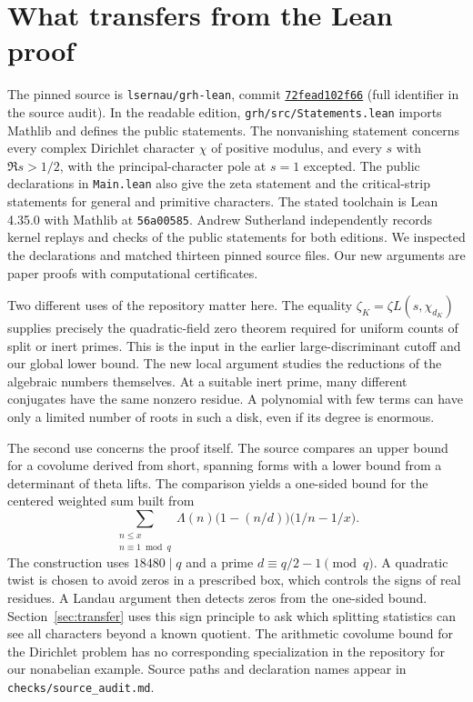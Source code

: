 \documentclass[11pt]{article}
\begin{document}
\section{What transfers from the Lean proof}
The pinned source is \texttt{lsernau/grh-lean}, commit
\href{https://github.com/lsernau/grh-lean/commit/72fead102f663d5c7a407964a13dc0cf9d977207}{\texttt{72fead102f66}} (full identifier in the source audit). In the readable edition, \texttt{grh/src/Statements.lean} imports Mathlib and defines the public statements. The nonvanishing statement concerns every complex Dirichlet character $\chi$ of positive modulus, and every $s$ with $\Re s>1/2$, with the principal-character pole at $s=1$ excepted. The public declarations in \texttt{Main.lean} also give the zeta statement and the critical-strip statements for general and primitive characters. The stated toolchain is Lean 4.35.0 with Mathlib at \texttt{56a00585}. Andrew Sutherland independently records kernel replays and checks of the public statements for both editions. We inspected the declarations and matched thirteen pinned source files. Our new arguments are paper proofs with computational certificates.\cite{repo,mitcheck}

Two different uses of the repository matter here. The equality $\zeta_K=\zeta L(s,\chi_{d_K})$ supplies precisely the quadratic-field zero theorem required for uniform counts of split or inert primes. This is the input in the earlier large-discriminant cutoff and our global lower bound. The new local argument studies the reductions of the algebraic numbers themselves. At a suitable inert prime, many different conjugates have the same nonzero residue. A polynomial with few terms can have only a limited number of roots in such a disk, even if its degree is enormous.

The second use concerns the proof itself. The source compares an upper bound for a covolume derived from short, spanning forms with a lower bound from a determinant of theta lifts. The comparison yields a one-sided bound for the centered weighted sum built from
\[
 \sum_{\substack{n\le x\\n\equiv 1\bmod q}}\Lambda(n)
 \bigl(1-(n/d)\bigr)\bigl(1/n-1/x\bigr).
\]
The construction uses $18480\mid q$ and a prime $d\equiv q/2-1\pmod q$. A quadratic twist is chosen to avoid zeros in a prescribed box, which controls the signs of real residues. A Landau argument then detects zeros from the one-sided bound. Section~\ref{sec:transfer} uses this sign principle to ask which splitting statistics can see all characters beyond a known quotient. The arithmetic covolume bound for the Dirichlet problem has no corresponding specialization in the repository for our nonabelian example. Source paths and declaration names appear in \texttt{checks/source\_audit.md}.










\end{document}
